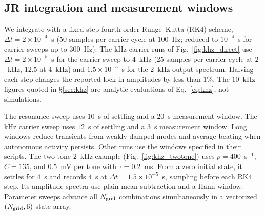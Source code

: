 \documentclass[11pt,a4paper]{article}
\providecommand{\DIFaddtex}[1]{{\protect\color{blue} \sf #1}} %
\providecommand{\DIFadd}[1]{\texorpdfstring{\DIFaddtex{#1}}{#1}} %
\begin{document}
\subsection{\DIFadd{JR integration and measurement windows}}\label{supp:jr-runs}
\DIFadd{We integrate with a fixed-step fourth-order Runge--Kutta (RK4) scheme,
$\Delta t=2\times10^{-4}$~s (50 samples per carrier cycle at $100$~Hz; reduced to
$10^{-4}$~s for carrier sweeps up to $300$~Hz). The kHz-carrier runs of
Fig.~\ref{fig:khz_direct} use $\Delta t=2\times10^{-5}$~s for the carrier sweep to
$4$~kHz (25 samples per carrier cycle at $2$~kHz, 12.5 at $4$~kHz) and
$1.5\times10^{-5}$~s for the $2$~kHz output spectrum. Halving each step changes the
reported lock-in amplitudes by less than $1\%$. The $10$~kHz figures quoted in
\S\ref{sec:khz} are analytic evaluations of Eq.~\eqref{eq:khz}, not simulations.
}

\DIFadd{The resonance sweep uses $10$~s of settling and a $20$~s
measurement window. The kHz carrier sweep uses $12$~s of settling and
a $3$~s measurement window. Long windows reduce transients from weakly damped modes and
average beating when autonomous activity persists. Other runs use the windows
specified in their scripts.
The two-tone $2$~kHz example (Fig.~\ref{fig:khz_twotone}) uses $p=400$~s$^{-1}$,
$C=135$, and $0.5$~mV per tone with $\tau=0.2$~ms. From a zero initial state,
it settles for $4$~s and records $4$~s at $\Delta t=1.5\times10^{-5}$~s,
sampling before each RK4 step. Its amplitude spectra use plain-mean subtraction
and a Hann window. Parameter sweeps advance all $N_{\rm grid}$ combinations simultaneously
in a vectorized $(N_{\rm grid},6)$ state array.
}

\fi
\end{document}
